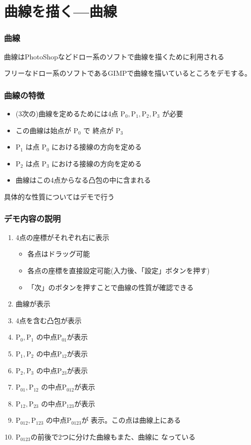 \section{曲線を描く---\Bezier 曲線}
\begin{frame}[containsverbatim]
 \frametitle{\Bezier 曲線}
 \Bezier 曲線はPhotoShopなどドロー系のソフトで曲線を描くために利用される

 フリーなドロー系のソフトであるGIMPで曲線を描いているところをデモする。
\end{frame}
\begin{frame}[containsverbatim]
 \frametitle{\Bezier 曲線の特徴}
 \begin{itemize}
  \item (3次の)\Bezier 曲線を定めるためには4点
        $\mathrm{P_0}, \mathrm{P_1}, \mathrm{P_2}, \mathrm{P_3}$ が必要
  \item この曲線は始点が $\mathrm{P_0}$ で 終点が $\mathrm{P_3}$
  \item $\mathrm{P_1}$ は点 $\mathrm{P_0}$ における接線の方向を定める
  \item $\mathrm{P_2}$ は点 $\mathrm{P_3}$ における接線の方向を定める
  \item 曲線はこの4点からなる凸包の中に含まれる
 \end{itemize}
 具体的な性質についてはデモで行う
\end{frame}
\begin{frame}[containsverbatim]
 \frametitle{デモ内容の説明}
\begin{enumerate}
 \item 4点の座標がそれぞれ右に表示
 \begin{itemize}
  \item 各点はドラッグ可能
  \item 各点の座標を直接設定可能(入力後、「設定」ボタンを押す)
  \item 「次」のボタンを押すことで\Bezier 曲線の性質が確認できる
 \end{itemize}
 \item \Bezier 曲線が表示
 \item 4点を含む凸包が表示
 \item $\mathrm{P_0}, \mathrm{P_1}$ の中点$\mathrm{P}_{01}$が表示
 \item $\mathrm{P_1}, \mathrm{P_2}$ の中点$\mathrm{P}_{12}$が表示
 \item $\mathrm{P_2}, \mathrm{P_3}$ の中点$\mathrm{P}_{23}$が表示
 \item $\mathrm{P_{01}}, \mathrm{P_{12}}$ の中点$\mathrm{P}_{012}$が表示
 \item $\mathrm{P_{12}}, \mathrm{P_{23}}$ の中点$\mathrm{P}_{123}$が表示
 \item $\mathrm{P_{012}}, \mathrm{P_{123}}$ の中点$\mathrm{P}_{0123}$が
       表示。この点は\Bezier 曲線上にある
 \item $\mathrm{P}_{0123}$の前後で2つに分けた曲線もまた、\Bezier 曲線に
       なっている
\end{enumerate}
\end{frame}
